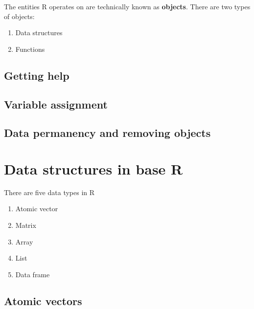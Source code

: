 \documentclass[
]{book}
\begin{document}
The entities R operates on are technically known as \textbf{objects}. There are two types of objects:

\begin{enumerate}
\def\labelenumi{\arabic{enumi}.}
\item
  Data structures
\item
  Functions
\end{enumerate}

\hypertarget{getting-help}{%
\section{Getting help}\label{getting-help}}

\hypertarget{variable-assignment}{%
\section{Variable assignment}\label{variable-assignment}}

\hypertarget{section}{%
\section{}\label{section}}

\hypertarget{data-permanency-and-removing-objects}{%
\section{Data permanency and removing objects}\label{data-permanency-and-removing-objects}}

\hypertarget{intro}{%
\chapter{Data structures in base R}\label{intro}}

There are five data types in R

\begin{enumerate}
\def\labelenumi{\arabic{enumi}.}
\item
  Atomic vector
\item
  Matrix
\item
  Array
\item
  List
\item
  Data frame
\end{enumerate}

\hypertarget{atomic-vectors}{%
\section{Atomic vectors}\label{atomic-vectors}}
\end{document}
